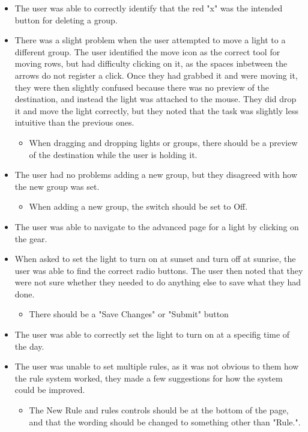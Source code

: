 \documentclass[oneside,openright]{book}
\begin{document}
\begin{itemize}
  \item The user was able to correctly identify that the red "x" was the intended button for deleting a group.
  \item There was a slight problem when the user attempted to move a light to a different group. The user identified the move icon as the correct tool for moving rows, but had difficulty clicking on it, as the spaces inbetween the arrows do not register a click. Once they had grabbed it and were moving it, they were then slightly confused because there was no preview of the destination, and instead the light was attached to the mouse. They did drop it and move the light correctly, but they noted that the task was slightly less intuitive than the previous ones.
    \begin{itemize}
      \item When dragging and dropping lights or groups, there should be a preview of the destination while the user is holding it.
    \end{itemize}
  \item The user had no problems adding a new group, but they disagreed with how the new group was set.
    \begin{itemize}
      \item When adding a new group, the switch should be set to Off.
    \end{itemize}
  \item The user was able to navigate to the advanced page for a light by clicking on the gear.
  \item When asked to set the light to turn on at sunset and turn off at sunrise, the user was able to find the correct radio buttons. The user then noted that they were not sure whether they needed to do anything else to save what they had done.
    \begin{itemize}
      \item There should be a "Save Changes" or "Submit" button
    \end{itemize}
  \item The user was able to correctly set the light to turn on at a specifig time of the day.
  \item The user was unable to set multiple rules, as it was not obvious to them how the rule system worked, they made a few suggestions for how the system could be improved.
    \begin{itemize}
      \item The New Rule and rules controls should be at the bottom of the page, and that the wording should be changed to something other than "Rule.".

\end{itemize}
\end{itemize}
\end{document}
